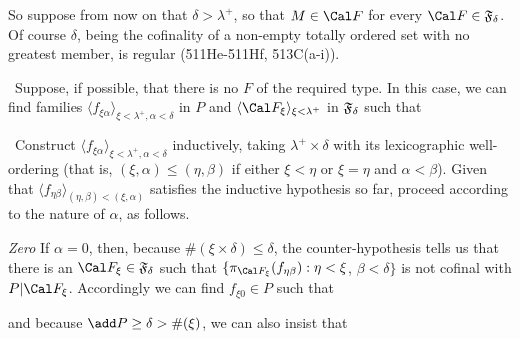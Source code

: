 {So suppose from now on
that $\delta>\lambda^+$, so that $M\in\Cal F$ for every
$\Cal F\in\frak F_{\delta}$.   Of course $\delta$, being the
cofinality of a non-empty totally ordered set
with no greatest member, is regular (511He-511Hf, 513C(a-i)).

\medskip

 \Quer\ Suppose, if possible, that there is no $F$ of the
required type.   In this case, we can find families
$\langle f_{\xi\alpha}\rangle_{\xi<\lambda^+,\alpha<\delta}$ in $P$ and
$\langle\Cal F_{\xi}\rangle_{\xi<\lambda^+}$ in $\frak F_{\delta}$ such
that


\noindent\Prf\ Construct
$\langle f_{\xi\alpha}\rangle_{\xi<\lambda^+,\alpha<\delta}$ inductively,
taking $\lambda^+\times\delta$ with its lexicographic well-ordering (that
is, $(\xi,\alpha)\le(\eta,\beta)$ if either $\xi<\eta$ or $\xi=\eta$ and
$\alpha<\beta$).   Given that
$\langle f_{\eta\beta}\rangle_{(\eta,\beta)<(\xi,\alpha)}$ satisfies the
inductive hypothesis so far, proceed according to the nature of $\alpha$,
as follows.

{\it Zero} If $\alpha=0$, then, because $\#(\xi\times\delta)\le\delta$, the
counter-hypothesis tells us that there is an
$\Cal F_{\xi}\in\frak F_{\delta}$ such that
$\{\pi_{\Cal F_{\xi}}(f_{\eta\beta}):\eta<\xi$, $\beta<\delta\}$ is
not cofinal with $P|\Cal F_{\xi}$.
Accordingly we can find $f_{\xi 0}\in P$ such that


\noindent and because $\add P\ge\delta>\#(\xi)$, we can also insist that

}
